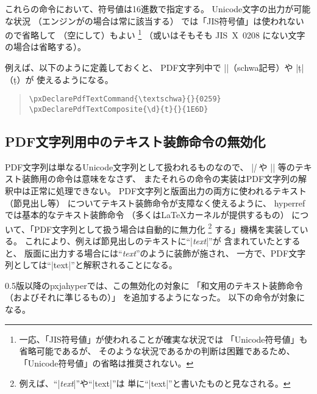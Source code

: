 \documentclass[uplatex,dvipdfmx,a4paper]{jsarticle}
\newcommand{\Pkg}[1]{\textsf{#1}}
\begin{document}
これらの命令において、符号値は16進数で指定する。
Unicode文字の出力が可能な状況
（エンジンが{\upLaTeX}の場合は常に該当する）
では「JIS符号値」は使われないので省略して
（空にして）もよい
\footnote{一応、「JIS符号値」が使われることが確実な状況では
「Unicode符号値」も省略可能であるが、
そのような状況であるかの判断は困難であるため、
「Unicode符号値」の省略は推奨されない。}%
（或いはそもそも JIS~X~0208 にない文字の場合は省略する）。

例えば、以下のように定義しておくと、
PDF文字列中で |\textschwa|（schwa記号）や |\d{t}|（\d{t}）が
使えるようになる。
\begin{quote}\small\begin{verbatim}
\pxDeclarePdfTextCommand{\textschwa}{}{0259}
\pxDeclarePdfTextComposite{\d}{t}{}{1E6D}
\end{verbatim}\end{quote}

\subsection{PDF文字列用中のテキスト装飾命令の無効化}
\label{ssec:disablecmds}

PDF文字列は単なるUnicode文字列として扱われるものなので、
|\textit| や |\large| 等のテキスト装飾用の命令は意味をなさず、
またそれらの命令の実装はPDF文字列の解釈中は正常に処理できない。
PDF文字列と版面出力の両方に使われるテキスト（節見出し等）
についてテキスト装飾命令が支障なく使えるように、
\Pkg{hyperref}では基本的なテキスト装飾命令
（多くは{\LaTeX}カーネルが提供するもの）
について、「PDF文字列として扱う場合は自動的に無力化
\footnote{例えば、“|\textit{text}|”や“|{\large text}|”は
  単に“|text|”と書いたものと見なされる。}
する」機構を実装している。
これにより、例えば節見出しのテキストに“|\textit{text}|”が
含まれていたとすると、
版面に出力する場合には“\textit{text}”のように装飾が施され、
一方で、PDF文字列としては“|text|”と解釈されることになる。

0.5版以降の\Pkg{pxjahyper}では、この無効化の対象に
「和文用のテキスト装飾命令（およびそれに準じるもの）」
を追加するようになった。
以下の命令が対象になる。
\end{document}
